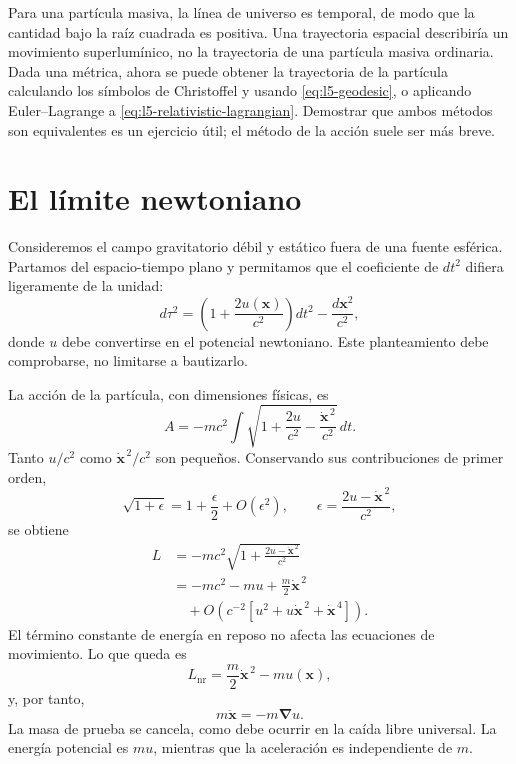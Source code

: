 Para una partícula masiva, la línea de universo es temporal, de modo que la cantidad bajo la raíz cuadrada es positiva. Una trayectoria espacial describiría un movimiento superlumínico, no la trayectoria de una partícula masiva ordinaria. Dada una métrica, ahora se puede obtener la trayectoria de la partícula calculando los símbolos de Christoffel y usando \eqref{eq:l5-geodesic}, o aplicando Euler--Lagrange a \eqref{eq:l5-relativistic-lagrangian}. Demostrar que ambos métodos son equivalentes es un ejercicio útil; el método de la acción suele ser más breve.

\section{El límite newtoniano}

Consideremos el campo gravitatorio débil y estático fuera de una fuente esférica. Partamos del espacio-tiempo plano y permitamos que el coeficiente de \(dt^2\) difiera ligeramente de la unidad:
\begin{equation}
d\tau^2
=\left(1+\frac{2u(\mathbf{x})}{c^2}\right)dt^2
-\frac{d\mathbf{x}^2}{c^2},
\label{eq:l5-weak-metric}
\end{equation}
donde \(u\) debe convertirse en el potencial newtoniano. Este planteamiento debe comprobarse, no limitarse a bautizarlo.

La acción de la partícula, con dimensiones físicas, es
\begin{equation}
A=-mc^2\int
\sqrt{1+\frac{2u}{c^2}
-\frac{\dot{\mathbf{x}}^{\,2}}{c^2}}\,dt.
\label{eq:l5-weak-action}
\end{equation}
Tanto \(u/c^2\) como \(\dot{\mathbf{x}}^{\,2}/c^2\) son pequeños. Conservando sus contribuciones de primer orden,
\begin{equation}
\sqrt{1+\epsilon}
=1+\frac{\epsilon}{2}+O(\epsilon^2),
\qquad
\epsilon=\frac{2u-\dot{\mathbf{x}}^{\,2}}{c^2},
\end{equation}
se obtiene
\begin{align}
L
&=-mc^2
\sqrt{1+\frac{2u-\dot{\mathbf{x}}^{\,2}}{c^2}}\\
&=-mc^2-mu+\frac{m}{2}\dot{\mathbf{x}}^{\,2}\\
&\quad+O\!\left(c^{-2}
 [u^2+u\dot{\mathbf{x}}^{\,2}+\dot{\mathbf{x}}^{\,4}]\right).
\label{eq:l5-newton-expansion}
\end{align}
El término constante de energía en reposo no afecta las ecuaciones de movimiento. Lo que queda es
\begin{equation}
L_{\mathrm{nr}}
=\frac{m}{2}\dot{\mathbf{x}}^{\,2}-m u(\mathbf{x}),
\label{eq:l5-newton-lagrangian}
\end{equation}
y, por tanto,
\begin{equation}
m\ddot{\mathbf{x}}=-m\boldsymbol{\nabla}u.
\label{eq:l5-newton-equation}
\end{equation}
La masa de prueba se cancela, como debe ocurrir en la caída libre universal. La energía potencial es \(m u\), mientras que la aceleración es independiente de \(m\).

